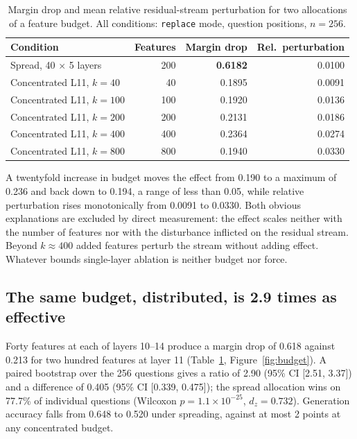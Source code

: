\documentclass[11pt,a4paper]{article}
\begin{document}
\begin{table}[t]
  \centering
  \caption{Margin drop and mean relative residual-stream perturbation for two
  allocations of a feature budget. All conditions: \texttt{replace} mode,
  question positions, $n = 256$.}
  \label{tab:budget}
  \begin{tabular}{lrrr}
    \toprule
    Condition & Features & Margin drop & Rel.\ perturbation \\
    \midrule
    Spread, 40 $\times$ 5 layers & 200 & \textbf{0.6182} & 0.0100 \\
    \midrule
    Concentrated L11, $k=40$  &  40 & 0.1895 & 0.0091 \\
    Concentrated L11, $k=100$ & 100 & 0.1920 & 0.0136 \\
    Concentrated L11, $k=200$ & 200 & 0.2131 & 0.0186 \\
    Concentrated L11, $k=400$ & 400 & 0.2364 & 0.0274 \\
    Concentrated L11, $k=800$ & 800 & 0.1940 & 0.0330 \\
    \bottomrule
  \end{tabular}
\end{table}

A twentyfold increase in budget moves the effect from 0.190 to a maximum of
0.236 and back down to 0.194, a range of less than 0.05, while relative
perturbation rises monotonically from 0.0091 to 0.0330. Both obvious
explanations are excluded by direct measurement: the effect scales neither with
the number of features nor with the disturbance inflicted on the residual
stream. Beyond $k \approx 400$ added features perturb the stream without adding
effect. Whatever bounds single-layer ablation is neither budget nor force.

\subsection{The same budget, distributed, is 2.9 times as effective}

Forty features at each of layers 10--14 produce a margin drop of 0.618 against
0.213 for two hundred features at layer 11 (Table~\ref{tab:budget},
Figure~\ref{fig:budget}). A paired bootstrap over the 256 questions gives a ratio of 2.90 (95\% CI
[2.51, 3.37]) and a difference of 0.405 (95\% CI [0.339, 0.475]); the spread
allocation wins on 77.7\% of individual questions (Wilcoxon $p = 1.1 \times
10^{-25}$, $d_z = 0.732$). Generation accuracy falls from 0.648 to 0.520 under
spreading, against at most 2 points at any concentrated budget.
\end{document}
